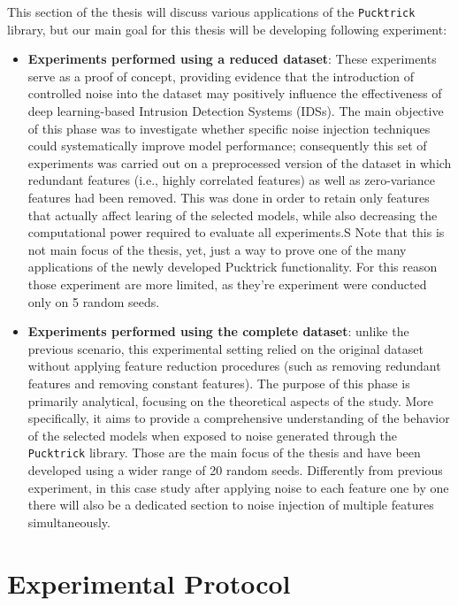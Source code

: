 \documentclass[../main.tex]{subfiles}
\begin{document}
This section of the thesis will discuss various applications of the \texttt{Pucktrick} library, but our main goal for this thesis will be developing following experiment: 
\begin{itemize}
    \item {} \textbf{Experiments performed using a reduced dataset}: These experiments serve as a proof of concept, providing evidence that the introduction of controlled noise into the dataset may positively influence the effectiveness of deep learning-based Intrusion Detection Systems (IDSs). The main objective of this phase was to investigate whether specific noise injection techniques could systematically improve model performance; consequently this set of experiments was carried out on a preprocessed version of the dataset in which redundant features (i.e., highly correlated features) as well as zero-variance features had been removed. This was done in order to retain only features that actually affect learing of the selected models, while also decreasing the computational power required to evaluate all experiments.S Note that this is not main focus of the thesis, yet, just a way to prove one of the many applications of the newly developed Pucktrick functionality. For this reason those experiment are more limited, as they're experiment were conducted only on 5 random seeds. 

    \item {} \textbf{Experiments performed using the complete dataset}: unlike the previous scenario, this experimental setting relied on the original dataset without applying feature reduction procedures (such as removing redundant features and removing constant features). The purpose of this phase is primarily analytical, focusing on the theoretical aspects of the study. More specifically, it aims to provide a comprehensive understanding of the behavior of the selected models when exposed to noise generated through the \texttt{Pucktrick} library. Those are the main focus of the thesis and have been developed using a wider range of 20 random seeds. Differently from previous experiment, in this case study after applying noise to each feature one by one there will also be a dedicated section to noise injection of multiple features simultaneously.
\end{itemize}


\newpage
\section{Experimental Protocol}
\label{sec:exp-protocol-features}
\end{document}
